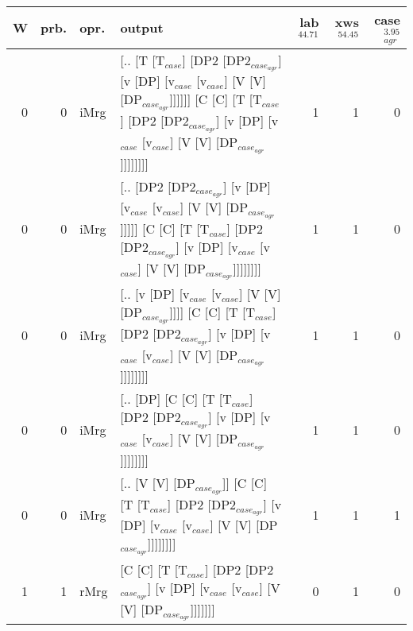 \begin{tabularx}{\linewidth}{rrlXrrr}
\hline
   W &   prb. & opr.   & output                                                                                                                                                                             &   lab$^{44.71}$ &   xws$^{54.45}$ &   case$_{agr}^{3.95}$ \\
\hline
   0 &   0 & iMrg & [.. [T [T$_{case}$] [DP2 [DP2$_{case_{agr}}$] [v [DP] [v$_{case}$ [v$_{case}$] [V [V] [DP$_{case_{agr}}$]]]]]] [C [C] [T [T$_{case}$] [DP2 [DP2$_{case_{agr}}$] [v [DP] [v$_{case}$ [v$_{case}$] [V [V] [DP$_{case_{agr}}$]]]]]]]] &             1 &             1 &                  0 \\
   0 &   0 & iMrg & [.. [DP2 [DP2$_{case_{agr}}$] [v [DP] [v$_{case}$ [v$_{case}$] [V [V] [DP$_{case_{agr}}$]]]]] [C [C] [T [T$_{case}$] [DP2 [DP2$_{case_{agr}}$] [v [DP] [v$_{case}$ [v$_{case}$] [V [V] [DP$_{case_{agr}}$]]]]]]]]              &             1 &             1 &                  0 \\
   0 &   0 & iMrg & [.. [v [DP] [v$_{case}$ [v$_{case}$] [V [V] [DP$_{case_{agr}}$]]]] [C [C] [T [T$_{case}$] [DP2 [DP2$_{case_{agr}}$] [v [DP] [v$_{case}$ [v$_{case}$] [V [V] [DP$_{case_{agr}}$]]]]]]]]                                   &             1 &             1 &                  0 \\
   0 &   0 & iMrg & [.. [DP] [C [C] [T [T$_{case}$] [DP2 [DP2$_{case_{agr}}$] [v [DP] [v$_{case}$ [v$_{case}$] [V [V] [DP$_{case_{agr}}$]]]]]]]]                                                                               &             1 &             1 &                  0 \\
   0 &   0 & iMrg & [.. [V [V] [DP$_{case_{agr}}$]] [C [C] [T [T$_{case}$] [DP2 [DP2$_{case_{agr}}$] [v [DP] [v$_{case}$ [v$_{case}$] [V [V] [DP$_{case_{agr}}$]]]]]]]]                                                              &             1 &             1 &                  1 \\
   1 &   1 & rMrg & [C [C] [T [T$_{case}$] [DP2 [DP2$_{case_{agr}}$] [v [DP] [v$_{case}$ [v$_{case}$] [V [V] [DP$_{case_{agr}}$]]]]]]]                                                                                         &             0 &             1 &                  0 \\
\hline
\end{tabularx}\endgroup\\
